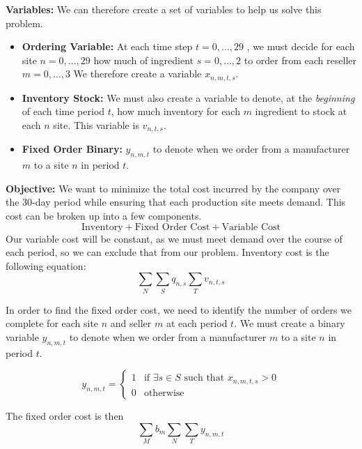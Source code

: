 \documentclass[11pt]{article}
\begin{document}
\textbf{Variables:}
We can therefore create a set of variables to help us solve this problem.
\begin{itemize}
    \item \textbf{Ordering Variable:} At each time step $t=0,\dots,29$ , we must decide for each site $n=0,\dots,29$ how much of ingredient $s=0,\dots,2$ to order from each reseller $m=0,\dots,3$
          We therefore create a variable $x_{n,m,t,s}$.
    \item \textbf{Inventory Stock:} We must also create a variable to denote, at the \textit{beginning} of each time period $t$, how much inventory for each $m$ ingredient to stock at each $n$ site.
          This variable is $v_{n,t,s}$.
    \item \textbf{Fixed Order Binary: } $y_{n,m,t}$ to denote when we order from a manufacturer $m$ to a site $n$ in period $t$.
\end{itemize}

\textbf{Objective:}
We want to minimize the total cost incurred by the company over the 30-day period while ensuring that each production site meets demand.
This cost can be broken up into a few components.
\begin{equation}
    \text{Inventory} + \text{Fixed Order Cost} + \text{Variable Cost}
\end{equation}
Our variable cost will be constant, as we must meet demand over the course of each period, so we can exclude that from our problem.
Inventory cost is the following equation:
\begin{equation}
    \sum_{N} \sum_{S} q_{n,s} \sum_{T} v_{n,t,s}
\end{equation}

In order to find the fixed order cost, we need to identify the number of orders we complete for each site $n$ and seller $m$ at each period $t$.
We must create a binary variable $y_{n,m,t}$ to denote when we order from a manufacturer $m$ to a site $n$ in period $t$.

\begin{equation}
    y_{n,m,t} =
    \begin{cases}
        1 & \text{if } \exists s \in S \text{ such that } x_{n,m,t,s} > 0 \\
        0 & \text{otherwise}
    \end{cases}
\end{equation}

The fixed order cost is then
\begin{equation}
    \sum_{M} b_m \sum_{N} \sum_{T} y_{n,m,t}
\end{equation}
\end{document}
